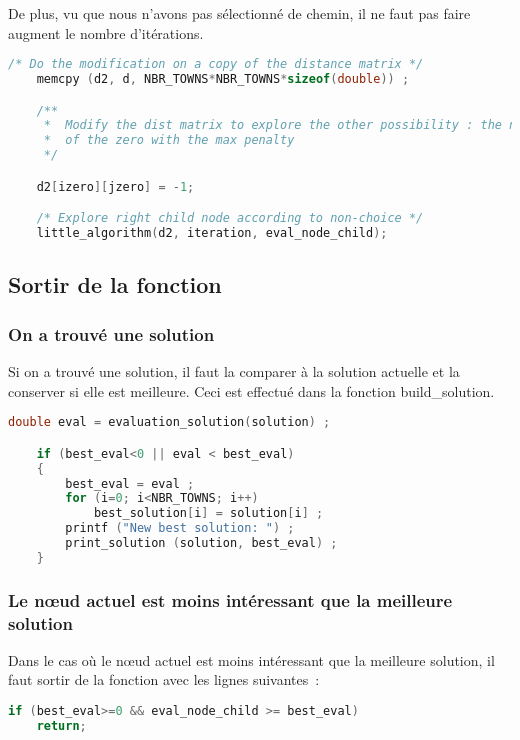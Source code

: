 \documentclass[11pt]{article}
\begin{document}
De plus, vu que nous n'avons pas sélectionné de chemin, il ne faut pas faire augment le nombre d'itérations.

\begin{lstlisting}[language=C]
    /* Do the modification on a copy of the distance matrix */
    memcpy (d2, d, NBR_TOWNS*NBR_TOWNS*sizeof(double)) ;

    /**
     *  Modify the dist matrix to explore the other possibility : the non-choice
     *  of the zero with the max penalty
     */

    d2[izero][jzero] = -1;

    /* Explore right child node according to non-choice */
    little_algorithm(d2, iteration, eval_node_child);
\end{lstlisting}

\subsection{Sortir de la fonction}

\subsubsection{On a trouvé une solution}

Si on a trouvé une solution, il faut la comparer à la solution actuelle et la conserver si elle est meilleure.
Ceci est effectué dans la fonction build\_solution.

\begin{lstlisting}[language=C]
    double eval = evaluation_solution(solution) ;

    if (best_eval<0 || eval < best_eval)
    {
        best_eval = eval ;
        for (i=0; i<NBR_TOWNS; i++)
            best_solution[i] = solution[i] ;
        printf ("New best solution: ") ;
        print_solution (solution, best_eval) ;
    }
\end{lstlisting}

\subsubsection{Le nœud actuel est moins intéressant que la meilleure solution}

Dans le cas où le nœud actuel est moins intéressant que la meilleure solution, il faut sortir de la fonction avec les lignes suivantes :

\begin{lstlisting}[language=C]
if (best_eval>=0 && eval_node_child >= best_eval)
    return;
\end{lstlisting}
\end{document}

